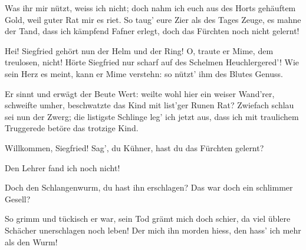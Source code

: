 \begin{drama}
\Siegfriedspeaks

Was ihr mir nützt,
weiss ich nicht;
doch nahm ich euch
aus des Horts gehäuftem Gold,
weil guter Rat mir es riet.
So taug' eure Zier
als des Tages Zeuge,
es mahne der Tand,
dass ich kämpfend Fafner erlegt,
doch das Fürchten noch nicht gelernt!


Hei! Siegfried gehört
nun der Helm und der Ring!
O, traute er Mime,
dem treulosen, nicht!
Hörte Siegfried nur scharf
auf des Schelmen Heuchlergered'!
Wie sein Herz es meint,
kann er Mime verstehn:
so nützt' ihm des Blutes Genuss.


\Mimespeaks


Er sinnt und erwägt
der Beute Wert:
weilte wohl hier
ein weiser Wand'rer,
schweifte umher,
beschwatzte das Kind
mit list'ger Runen Rat?
Zwiefach schlau
sei nun der Zwerg;
die listigste Schlinge
leg' ich jetzt aus,
dass ich mit traulichem
Truggerede
betöre das trotzige Kind.


Willkommen, Siegfried!
Sag', du Kühner,
hast du das Fürchten gelernt?

\Siegfriedspeaks

Den Lehrer fand ich noch nicht!

\Mimespeaks

Doch den Schlangenwurm,
du hast ihn erschlagen?
Das war doch ein schlimmer Gesell?

\Siegfriedspeaks

So grimm und tückisch er war,
sein Tod grämt mich doch schier,
da viel üblere Schächer
unerschlagen noch leben!
Der mich ihn morden hiess,
den hass' ich mehr als den Wurm!

\Mimespeaks



\end{drama}
